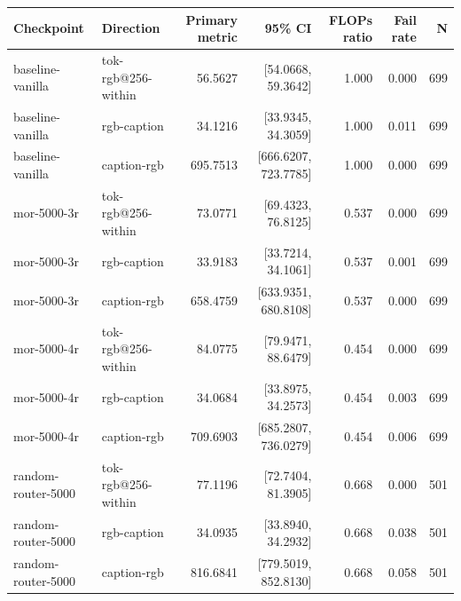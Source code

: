 
\begin{table}[ht]
\centering
\begin{tabular}{llrrrrr}
\toprule
Checkpoint & Direction & Primary metric & 95\% CI & FLOPs ratio & Fail rate & N \\
\midrule
baseline-vanilla & tok-rgb@256-within & 56.5627 & [54.0668, 59.3642] & 1.000 & 0.000 & 699 \\
baseline-vanilla & rgb-caption & 34.1216 & [33.9345, 34.3059] & 1.000 & 0.011 & 699 \\
baseline-vanilla & caption-rgb & 695.7513 & [666.6207, 723.7785] & 1.000 & 0.000 & 699 \\
mor-5000-3r & tok-rgb@256-within & 73.0771 & [69.4323, 76.8125] & 0.537 & 0.000 & 699 \\
mor-5000-3r & rgb-caption & 33.9183 & [33.7214, 34.1061] & 0.537 & 0.001 & 699 \\
mor-5000-3r & caption-rgb & 658.4759 & [633.9351, 680.8108] & 0.537 & 0.000 & 699 \\
mor-5000-4r & tok-rgb@256-within & 84.0775 & [79.9471, 88.6479] & 0.454 & 0.000 & 699 \\
mor-5000-4r & rgb-caption & 34.0684 & [33.8975, 34.2573] & 0.454 & 0.003 & 699 \\
mor-5000-4r & caption-rgb & 709.6903 & [685.2807, 736.0279] & 0.454 & 0.006 & 699 \\
random-router-5000 & tok-rgb@256-within & 77.1196 & [72.7404, 81.3905] & 0.668 & 0.000 & 501 \\
random-router-5000 & rgb-caption & 34.0935 & [33.8940, 34.2932] & 0.668 & 0.038 & 501 \\
random-router-5000 & caption-rgb & 816.6841 & [779.5019, 852.8130] & 0.668 & 0.058 & 501 \\
\bottomrule
\end{tabular}
\end{table}
